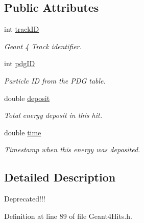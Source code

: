 \subsection*{Public Attributes}
\begin{DoxyCompactItemize}
\item 
int \hyperlink{struct_d_d4hep_1_1_simulation_1_1_geant4_hit_1_1_monte_carlo_contrib_a9dff0f94a376999512fc5d80ac2e2309}{trackID}
\begin{DoxyCompactList}\small\item\em Geant 4 Track identifier. \item\end{DoxyCompactList}\item 
int \hyperlink{struct_d_d4hep_1_1_simulation_1_1_geant4_hit_1_1_monte_carlo_contrib_aa0b40f39fd3df147934c6a2d609e72c1}{pdgID}
\begin{DoxyCompactList}\small\item\em Particle ID from the PDG table. \item\end{DoxyCompactList}\item 
double \hyperlink{struct_d_d4hep_1_1_simulation_1_1_geant4_hit_1_1_monte_carlo_contrib_a3bbe67139ddec239f5dc33ace2986bb1}{deposit}
\begin{DoxyCompactList}\small\item\em Total energy deposit in this hit. \item\end{DoxyCompactList}\item 
double \hyperlink{struct_d_d4hep_1_1_simulation_1_1_geant4_hit_1_1_monte_carlo_contrib_aa843f5069ad2f9e03d085bda49e9b658}{time}
\begin{DoxyCompactList}\small\item\em Timestamp when this energy was deposited. \item\end{DoxyCompactList}\end{DoxyCompactItemize}


\subsection{Detailed Description}
Deprecated!!! 

Definition at line 89 of file Geant4Hits.h.

